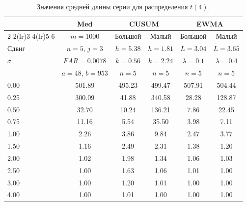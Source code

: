 \begin{table}[!ht]
	\centering
	\caption{Значения средней длины серии для распределения \(t(4)\).}
	\label{tab:4.20c}
	\small
	\begin{tabular}{@{}lccccc@{}}
		\toprule
		& Med & \multicolumn{2}{c}{CUSUM} & \multicolumn{2}{c}{EWMA} \\
		\cmidrule(lr){2-2}\cmidrule(lr){3-4}\cmidrule(lr){5-6}
		& \(m = 1000\) & Большой & Малый & Большой & Малый \\
		Сдвиг & \(n = 5\), \(j = 3\) & \(h = 5.38\) & \(h = 1.81\) & \(L = 3.04\) & \(L = 3.65\) \\
		\(\sigma\) & \(FAR = 0.0078\) & \(k = 0.56\) & \(k = 2.24\) & \(\lambda = 0.1\) & \(\lambda = 0.4\) \\
		& \(a = 48\), \(b = 953\) & \(n = 5\) & \(n = 5\) & \(n = 5\) & \(n = 5\) \\
		\midrule
		0.00 & 501.89 & 495.23 & 499.47 & 507.91 & 504.44 \\
		0.25 & 300.09 & 41.88 & 340.58 & 28.28 & 128.87 \\
		0.50 & 32.70 & 10.24 & 136.21 & 7.86 & 22.45 \\
		0.75 & 11.16 & 5.54 & 35.50 & 3.98 & 7.11 \\
		1.00 & 2.26 & 3.86 & 9.84 & 2.47 & 3.77 \\
		1.50 & 1.16 & 2.49 & 2.31 & 1.38 & 1.20 \\
		2.00 & 1.02 & 1.98 & 1.34 & 1.06 & 1.03 \\
		2.50 & 1.00 & 1.63 & 1.06 & 1.01 & 1.00 \\
		3.00 & 1.00 & 1.20 & 1.01 & 1.00 & 1.00 \\
		4.00 & 1.00 & 1.01 & 1.00 & 1.00 & 1.00 \\
		\bottomrule
	\end{tabular}
\end{table}

